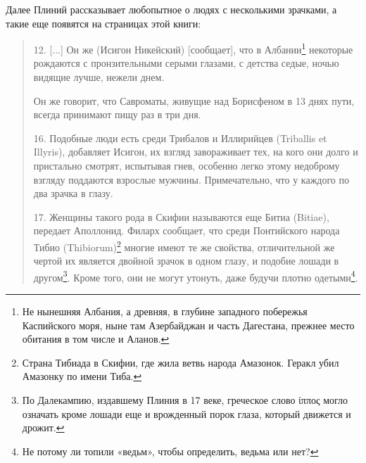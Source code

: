 Далее Плиний рассказывает любопытное о людях с несколькими зрачками, а такие еще появятся на страницах этой книги: 

\begin{quotation}
12. [...] Он же (Исигон Никейский) [сообщает], что в Албании\footnote{Не нынешняя Албания, а древняя, в глубине западного побережья Каспийского моря, ныне там Азербайджан и часть Дагестана, прежнее место обитания в том числе и Аланов.} некоторые рождаются с пронзительными серыми глазами, с детства седые, ночью видящие лучше, нежели днем. 


Он же говорит, что Савроматы, живущие над Борисфеном в 13 днях пути, всегда принимают пищу раз в три дня.

16. Подобные люди есть среди Трибалов и Иллирийцев (Triballis et Illyris), добавляет Исигон, их взгляд завораживает тех, на кого они долго и пристально смотрят, испытывая гнев, особенно легко этому недоброму взгляду поддаются взрослые мужчины. Примечательно, что у каждого по два зрачка в глазу.


17. Женщины такого рода в Скифии называются еще Битиа (Bitiae), передает Аполлонид. Филарх сообщает, что среди Понтийского народа Тибио (Thibio\-rum)\footnote{Страна Тибиада в Скифии, где жила ветвь народа Амазонок. Геракл убил Амазонку по имени Тиба.} многие имеют те же свойства, отличительной же чертой их является двойной зрачок в одном глазу, и подобие лошади в другом\footnote{По Далекампию, издавшему Плиния в 17 веке, греческое слово ίππος могло означать кроме лошади еще и врожденный порок глаза, который движется и дрожит.}. Кроме того, они не могут утонуть, даже будучи плотно одетыми\footnote{Не потому ли топили «ведьм», чтобы определить, ведьма или нет?}. 
\end{quotation}


